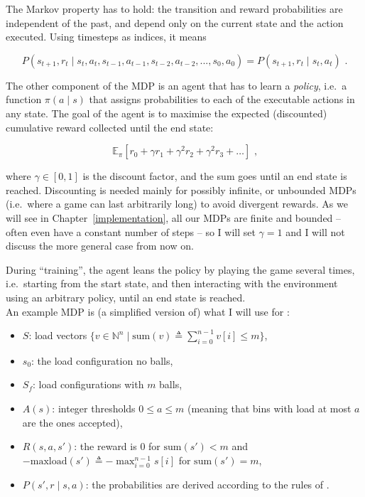 The Markov property has to hold: the transition and reward probabilities are independent of the past, and depend only on the current state and the action executed. Using timesteps as indices, it means

\begin{equation} \label{eq:MarkovProperty}
P(s_{t+1},r_{t} \mid s_{t}, a_{t}, s_{t-1}, a_{t-1}, s_{t-2}, a_{t-2}, ..., s_{0}, a_{0}) = P(s_{t+1},r_{t} \mid s_{t}, a_{t})\text{ .}
\end{equation}


The other component of the MDP is an agent that has to learn a \textit{policy}, i.e.\ a function $\pi(a\mid s)$ that assigns probabilities to each of the executable actions in any state. The goal of the agent is to maximise the expected (discounted) cumulative reward collected until the end state:

\begin{equation}\label{eq:cumReward}
\mathbb{E}_{\pi}[r_{0} + \gamma r_{1} + \gamma^2 r_{2} + \gamma^2 r_{3} + \ldots]\text{ ,}
\end{equation}

where $\gamma \in [0, 1]$ is the discount factor, and the sum goes until an end state is reached. Discounting is needed mainly for possibly infinite, or unbounded MDPs (i.e.\ where a game can last arbitrarily long) to avoid divergent rewards. As we will see in Chapter~\ref{implementation}, all our MDPs are finite and bounded -- often even have a constant number of steps -- so I will set $\gamma=1$ and I will not discuss the more general case from now on.


During ``training'', the agent leans the policy by playing the game several times, i.e.\ starting from the start state, and then interacting with the environment using an arbitrary policy, until an end state is reached.\\

An example MDP is (a simplified version of) what I will use for \TwoThinning:

\begin{itemize}[itemsep=0pt]
    \item 
    $S$: load vectors $\{v\in \mathbb{N}^n\mid\mathrm{sum}(v)\triangleq \sum_{i=0}^{n-1}v[i]\leq m\}$,
    \item
    $s_0$: the load configuration no balls,
    \item
    $S_f$: load configurations with $m$ balls,
    \item
    $A(s)$: integer thresholds $0\leq a\leq m$ (meaning that bins with load at most $a$ are the ones accepted),
    \item
    $R(s, a, s')$: the reward is $0$ for $\mathrm{sum}(s')<m$ and $-\mathrm{maxload}(s')\triangleq -\max_{i=0}^{n-1} s[i]$ for $\mathrm{sum}(s')=m$,
    \item
    $P(s', r \mid s, a)$: the probabilities are derived according to the rules of \TwoThinning.
\end{itemize}



